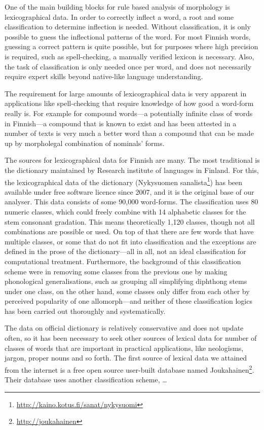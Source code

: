 \documentclass[a4paper,12pt]{article}
\begin{document}
One of the main building blocks for rule based analysis of morphology is
lexicographical data. In order to correctly inflect a word, a root and some
classification to determine inflection is needed. Without classification, it is
only possible to guess the inflectional patterns of the word. For most Finnish
words, guessing a correct pattern is quite possible, but for purposes where
high precision is required, such as spell-checking, a manually verified lexicon
is necessary. Also, the task of classification is only needed once per word,
and does not necessarily require expert skills beyond native-like language
understanding.

The requirement for large amounts of lexicographical data is very apparent in
applications like spell-checking that require knowledge of how good a word-form
really is. For example for compound words---a potentially infinite class of
words in Finnish---a compound that is known to exist and has been attested in
a number of texts is very much a better word than a compound that can be made
up by morpholegal combination of nominals' forms.

The sources for lexicographical data for Finnish are many. The most traditional
is the dictionary maintained by Research institute of languages in Finland. For
this, the lexicographical data of the dictionary (Nykysuomen
sanalista\footnote{\url{http://kaino.kotus.fi/sanat/nykysuomi}}) has been
available under free software licence since 2007, and it is the original base
of our analyser. This data consists of some 90,000 word-forms. The
classification uses 80 numeric classes, which could freely combine with 14
alphabetic classes for the stem consonant gradation.  This means theoretically
1,120 classes, though not all combinations are possible or used. On top of that
there are few words that have multiple classes, or some that do not fit into
classification and the exceptions are defined in the prose of the
dictionary---all in all, not an ideal classification for computational
treatment. Furthermore, the background of this classification scheme were in
removing some classes from the previous one by making phonological
generalisations, such as grouping all simplifying diphthong stems under one
class, on the other hand, some classes only differ from each other by perceived
popularity of one allomorph---and neither of these classification logics has
been carried out thoroughly and systematically.

The data on official dictionary is relatively conservative and does not update
often, so it has been necessary to seek other sources of lexical data for number
of classes of words that are important in practical applications, like
neologisms, jargon, proper nouns and so forth. The first source of lexical data
we attained from the internet is a free open source user-built database named
Joukahainen\footnote{\url{http://joukahainen}}. Their database uses another
classification scheme, \ldots
\end{document}
